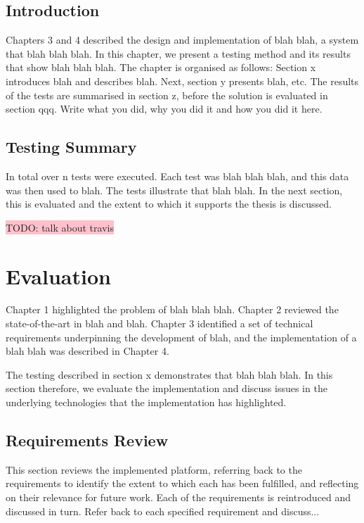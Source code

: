 \subsection{Introduction} \label{s-i--t-a-e--i}

Chapters 3 and 4 described the design and implementation of blah blah, a system that blah blah blah.  In this chapter, we present a testing method and its results that show blah blah blah.  The chapter is organised as follows:  Section x introduces blah and describes blah.  Next, section y presents blah, etc.
The results of the tests are summarised in section z, before the solution is evaluated in section qqq.
Write what you did, why you did it and how you did it here.

\subsection{Testing Summary} \label{s-i--testing-summary}

In total over n tests were executed. Each test was blah blah blah, and this data was then used to blah. The tests illustrate that blah blah. In the next section, this is evaluated and the extent to which it supports the thesis is discussed.

\colorbox{pink}{TODO: talk about travis}


\section{Evaluation} \label{s-i--evaluation}

Chapter 1 highlighted the problem of blah blah blah. Chapter 2 reviewed the state-of-the-art in blah and blah.  Chapter 3 identified a set of technical requirements underpinning the development of blah, and the implementation of a blah blah was described in Chapter 4.

The testing described in section x demonstrates that blah blah blah. In this section therefore, we evaluate the implementation and discuss issues in the underlying technologies that the implementation has highlighted.

\subsection{Requirements Review} \label{s-i--requirements-review}

This section reviews the implemented platform, referring back to the requirements to identify the extent to which each has been fulfilled, and reflecting on their relevance for future work. Each of the requirements is reintroduced and discussed in turn.
Refer back to each specified requirement and discuss...



